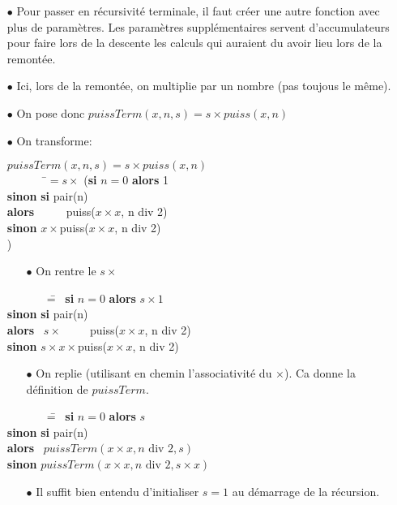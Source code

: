\documentclass[10pt]{article}\usepackage[correction]{esial}
\begin{document}
\begin{Reponse}
  \begin{itemize}
  \item[$\bullet$] Pour passer en récursivité terminale, il faut créer une
    autre fonction avec plus de paramètres. Les paramètres supplémentaires
    servent d'accumulateurs pour faire lors de la descente les calculs qui
    auraient du avoir lieu lors de la remontée.
  \item[$\bullet$] Ici, lors de la remontée, on multiplie par un nombre (pas
    toujous le même).
  \item[$\bullet$] On pose donc $puissTerm(x, n, s) = s\times puiss(x, n)$
  \item[$\bullet$] On transforme: 
    \begin{tabbing}
      $puissTerm(x, n ,s)=s\times puiss(x, n)$\\
      ~~~~~~~\=$=s\times$ (\=\textbf{si} $n=0$ \=\textbf{alors} 1\\
      \>\>\>\textbf{sinon} \=\textbf{si} pair(n)\\
      \>\>\>\>\textbf{alors} ~~~~~puiss($x\times x$, n div 2)\\
      \>\>\>\>\textbf{sinon} $x\times $puiss($x\times x$, n div 2)\\
      \>\>)
    \end{tabbing}
  \begin{itemize}
  \item[$\bullet$] On rentre le $s\times$
  \end{itemize}
    \begin{tabbing}
      ~~~~~~~=\= ~\textbf{si} $n=0$ \=\textbf{alors} $s\times 1$\\
      \>\>\textbf{sinon} \=\textbf{si} pair(n)\\
      \>\>\>\textbf{alors} ~$s\times$~~~~~puiss($x\times x$, n div 2)\\
      \>\>\>\textbf{sinon} $s\times x\times $puiss($x\times x$, n div 2)
  \end{tabbing}
  \begin{itemize}
  \item[$\bullet$] On replie (utilisant en chemin l'associativité du
    $\times$). Ca donne la définition de $puissTerm$.
  \end{itemize}
    \begin{tabbing}
      ~~~~~~~=\= ~\textbf{si} $n=0$ \=\textbf{alors} $s$\\
      \>\>\textbf{sinon} \=\textbf{si} pair(n)\\
      \>\>\>\textbf{alors} ~$puissTerm(x\times x, n\text{ div }2, s)$\\
      \>\>\>\textbf{sinon} $puissTerm(x\times x, n\text{ div }2, s\times x)$
  \end{tabbing}

  \begin{itemize}
  \item[$\bullet$] Il suffit bien entendu d'initialiser $s=1$ au démarrage de
    la récursion.
  \end{itemize}

\end{itemize}
\end{Reponse}
\end{document}
